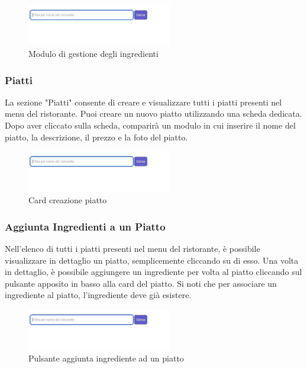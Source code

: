         \begin{figure}[htbp]
            \centering
            \includegraphics[width=0.5625\textwidth]{./img/Dettaglio.jpg}
            \caption{Modulo di gestione degli ingredienti}
        \end{figure}

    \subsubsection{Piatti}
    La sezione "Piatti" consente di creare e visualizzare tutti i piatti presenti nel menu del ristorante. Puoi creare un nuovo piatto utilizzando una scheda dedicata. Dopo aver cliccato sulla scheda, comparirà un modulo in cui inserire il nome del piatto, la descrizione, il prezzo e la foto del piatto.
    
        \begin{figure}[htbp]
            \centering
            \includegraphics[width=0.5625\textwidth]{./img/Dettaglio.jpg}
            \caption{Card creazione piatto}
        \end{figure}

    \subsubsection{Aggiunta Ingredienti a un Piatto}
    Nell'elenco di tutti i piatti presenti nel menu del ristorante, è possibile visualizzare in dettaglio un piatto, semplicemente cliccando su di esso. Una volta in dettaglio, è possibile aggiungere un ingrediente per volta al piatto cliccando sul pulsante apposito in basso alla card del piatto. Si noti che per associare un ingrediente al piatto, l'ingrediente deve già esistere.
    
        \begin{figure}[htbp]
            \centering
            \includegraphics[width=0.5625\textwidth]{./img/Dettaglio.jpg}
            \caption{Pulsante aggiunta ingrediente ad un piatto}
        \end{figure}
        
